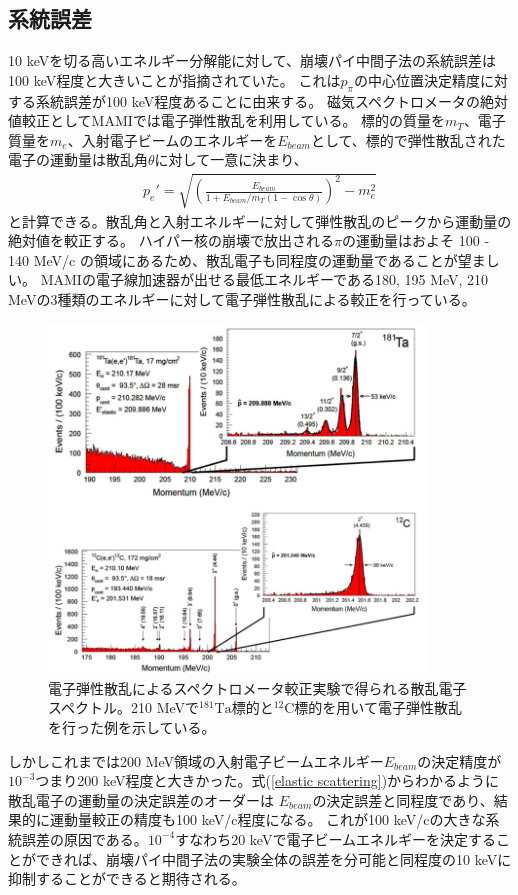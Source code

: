 \documentclass[a4paper,11pt,uplatex]{jsbook}
\begin{document}
\subsection{系統誤差}
10 keVを切る高いエネルギー分解能に対して、崩壊パイ中間子法の系統誤差は100 keV程度と大きいことが指摘されていた。
これは$p_\pi$の中心位置決定精度に対する系統誤差が100 keV程度あることに由来する。
磁気スペクトロメータの絶対値較正としてMAMIでは電子弾性散乱を利用している。
標的の質量を$m_T$、電子質量を$m_e$、入射電子ビームのエネルギーを$E_{beam}$として、標的で弾性散乱された電子の運動量は散乱角$\theta$に対して一意に決まり、
\begin{eqnarray}
  p_e' = \sqrt{\left(\frac{E_{beam}}{1 + E_{beam}/m_T(1 - \cos{\theta})} \right)^2 - m_e^2}\label{elastic scattering}
\end{eqnarray}
と計算できる。散乱角と入射エネルギーに対して弾性散乱のピークから運動量の絶対値を較正する。
ハイパー核の崩壊で放出される$\pi$の運動量はおよそ 100 - 140 MeV/c の領域にあるため、散乱電子も同程度の運動量であることが望ましい。
MAMIの電子線加速器が出せる最低エネルギーである180, 195 MeV, 210 MeVの3種類のエネルギーに対して電子弾性散乱による較正を行っている。
\begin{figure}
  \centering
  \includegraphics[width=10cm]{image/1-elastic.png}
  \caption[電子弾性散乱によるスペクトロメータ較正]{電子弾性散乱によるスペクトロメータ較正実験で得られる散乱電子スペクトル。210 MeVで$^{181}\text{Ta}$標的と$^{12}\text{C}$標的を用いて電子弾性散乱を行った例を示している。\cite{elastic}}
\end{figure}


しかしこれまでは200 MeV領域の入射電子ビームエネルギー$E_{beam}$の決定精度が$10^{-3}$つまり200 keV程度と大きかった。式(\ref{elastic scattering})からわかるように散乱電子の運動量の決定誤差のオーダーは
$E_{beam}$の決定誤差と同程度であり、結果的に運動量較正の精度も100 keV/c程度になる。
これが100 keV/cの大きな系統誤差の原因である。$10^{-4}$すなわち$20$ keVで電子ビームエネルギーを決定することができれば、崩壊パイ中間子法の実験全体の誤差を分可能と同程度の10 keVに抑制することができると期待される。
\end{document}
